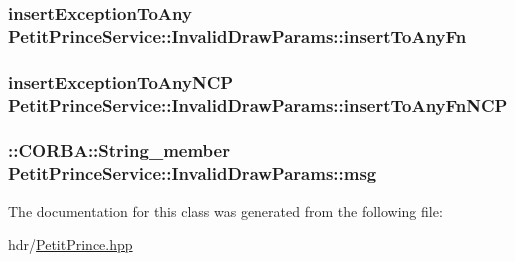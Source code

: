 \subsubsection[{\texorpdfstring{insert\+To\+Any\+Fn}{insertToAnyFn}}]{ insert\+Exception\+To\+Any Petit\+Prince\+Service\+::\+Invalid\+Draw\+Params\+::insert\+To\+Any\+Fn\hspace{0.3cm}{\ttfamily [static]}}\hypertarget{class_petit_prince_service_1_1_invalid_draw_params_a3c0d3050311043226e9d0a0882d4c25f}{}\label{class_petit_prince_service_1_1_invalid_draw_params_a3c0d3050311043226e9d0a0882d4c25f}
\subsubsection[{\texorpdfstring{insert\+To\+Any\+Fn\+N\+CP}{insertToAnyFnNCP}}]{ insert\+Exception\+To\+Any\+N\+CP Petit\+Prince\+Service\+::\+Invalid\+Draw\+Params\+::insert\+To\+Any\+Fn\+N\+CP\hspace{0.3cm}{\ttfamily [static]}}\hypertarget{class_petit_prince_service_1_1_invalid_draw_params_afce432eda8989d47faee11da1a73348e}{}\label{class_petit_prince_service_1_1_invalid_draw_params_afce432eda8989d47faee11da1a73348e}
\subsubsection[{\texorpdfstring{msg}{msg}}]{\setlength{\rightskip}{0pt plus 5cm}\+::C\+O\+R\+B\+A\+::\+String\+\_\+member Petit\+Prince\+Service\+::\+Invalid\+Draw\+Params\+::msg}\hypertarget{class_petit_prince_service_1_1_invalid_draw_params_ad20b320baca257a2276e76a6efc94a91}{}\label{class_petit_prince_service_1_1_invalid_draw_params_ad20b320baca257a2276e76a6efc94a91}


The documentation for this class was generated from the following file\+:\begin{DoxyCompactItemize}
\item 
hdr/\hyperlink{_petit_prince_8hpp}{Petit\+Prince.\+hpp}\end{DoxyCompactItemize}
